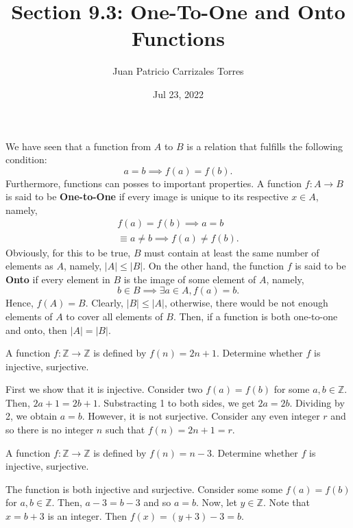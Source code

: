 \documentclass[12pt]{article}
\newcommand{\Z}{\mathbb{Z}}
\newenvironment{problem}[2][Problem]{\begin{trivlist} \item[\hskip \labelsep {\bfseries #1}\hskip \labelsep {\bfseries #2.}]}{\end{trivlist}}
\newenvironment{solution}[1][Solution]{\begin{trivlist} \item[\hskip \labelsep {\bfseries #1}]}{\end{trivlist}}
\begin{document}
  
 \title{Section 9.3: One-To-One and Onto Functions}
   \author{Juan Patricio Carrizales Torres}
     \date{Jul 23, 2022}
       \maketitle
  We have seen that a function from $A$ to $B$ is a relation that fulfills the following condition:      
    \begin{equation*}
      a=b \implies f(a)=f(b).
    \end{equation*}
  Furthermore, functions can posses to important properties. A function $f:A\to B$ is said to be \textbf{One-to-One} if every image is unique to its respective $x\in A$, namely,
    \begin{align*}
      f(a)=f(b) \implies a=b\\
      \equiv a\neq b \implies f(a)\neq f(b).
    \end{align*}
 Obviously, for this to be true, $B$ must contain at least the same number of elements as $A$, namely, $|A|\leq |B|$. On the other hand, the function $f$ is said to be \textbf{Onto} if every element in $B$ is the image of some element of $A$, namely,
    \begin{equation*}
      b\in B \implies \exists a\in A, f(a)=b.
    \end{equation*}
    Hence, $f(A)=B$. Clearly, $|B|\leq |A|$, otherwise, there would be not enough elements of $A$ to cover all elements of $B$. Then, if a function is both one-to-one and onto, then $|A|=|B|$.
    \begin{problem}{20}
      A function $f:\Z \to \Z$ is defined by $f(n)=2n+1$. Determine whether $f$ is injective, surjective. 
    \begin{solution}
      First we show that it is injective. Consider two $f(a)=f(b)$ for some $a,b\in \Z$. Then, $2a+1=2b+1$. Substracting 1 to both sides, we get $2a=2b$. Dividing by 2, we obtain $a=b$. However, it is not surjective. Consider any even integer $r$ and so there is no integer $n$ such that $f(n)=2n+1=r$.
    \end{solution}
    \end{problem}
    \begin{problem}{21}
	A function $f:\Z\to \Z$ is defined by $f(n)=n-3$. Determine whether $f$ is injective, surjective.
    \begin{solution}
      The function is both injective and surjective. Consider some some $f(a)=f(b)$ for $a,b\in \Z$. Then, $a-3=b-3$ and so $a=b$. Now, let $y\in \Z$. Note that $x=b+3$ is an integer. Then $f(x) = (y+3)-3=b$.
    \end{solution}
    \end{problem}
\end{document}
